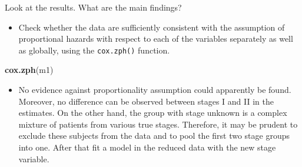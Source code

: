 \documentclass[
]{book}
\newenvironment{Shaded}{\begin{snugshade}}{\end{snugshade}}
\newcommand{\AttributeTok}[1]{\textcolor[rgb]{0.13,0.29,0.53}{#1}}
\newcommand{\CommentTok}[1]{\textcolor[rgb]{0.56,0.35,0.01}{\textit{#1}}}
\newcommand{\DecValTok}[1]{\textcolor[rgb]{0.00,0.00,0.81}{#1}}
\newcommand{\FunctionTok}[1]{\textcolor[rgb]{0.13,0.29,0.53}{\textbf{#1}}}
\newcommand{\NormalTok}[1]{#1}
\newcommand{\OtherTok}[1]{\textcolor[rgb]{0.56,0.35,0.01}{#1}}
\newcommand{\SpecialCharTok}[1]{\textcolor[rgb]{0.81,0.36,0.00}{\textbf{#1}}}
\newcommand{\StringTok}[1]{\textcolor[rgb]{0.31,0.60,0.02}{#1}}
\providecommand{\tightlist}{%
  \setlength{\itemsep}{0pt}\setlength{\parskip}{0pt}}
\begin{document}
Look at the results. What are the main findings?

\begin{itemize}
\tightlist
\item
  Check whether the data are sufficiently consistent with the assumption
  of proportional hazards with respect to each of the variables
  separately as well as globally, using the \texttt{cox.zph()} function.
\end{itemize}

\begin{Shaded}
\begin{Highlighting}[]
\FunctionTok{cox.zph}\NormalTok{(m1)}
\end{Highlighting}
\end{Shaded}

\begin{itemize}
\tightlist
\item
  No evidence against proportionality assumption could apparently be
  found. Moreover, no difference can be observed between stages I and II
  in the estimates. On the other hand, the group with stage unknown is a
  complex mixture of patients from various true stages. Therefore, it
  may be prudent to exclude these subjects from the data and to pool the
  first two stage groups into one. After that fit a model in the reduced
  data with the new stage variable.
\end{itemize}

\begin{Shaded}
\end{Shaded}
\end{document}
